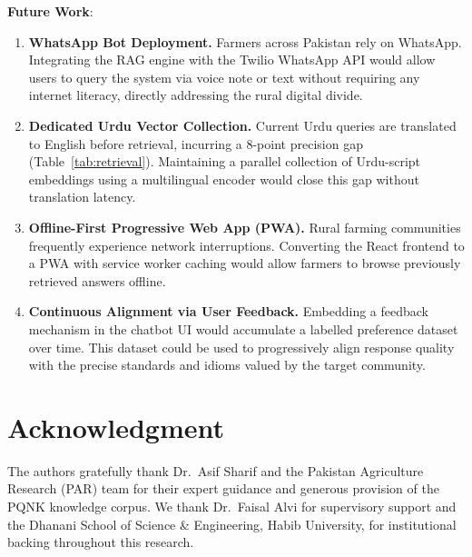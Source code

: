 \documentclass[conference]{IEEEtran}
\begin{document}
\textbf{Future Work}:
\begin{enumerate}[noitemsep, leftmargin=*]

  \item \textbf{WhatsApp Bot Deployment.}
        Farmers across Pakistan rely on WhatsApp. Integrating the RAG engine with the Twilio
        WhatsApp API would allow users to query the system via voice note or text without
        requiring any internet literacy, directly addressing the rural digital divide.

  \item \textbf{Dedicated Urdu Vector Collection.}
        Current Urdu queries are translated to English before retrieval, incurring a
        8-point precision gap (Table~\ref{tab:retrieval}). Maintaining a parallel
        collection of Urdu-script embeddings using a multilingual encoder would close
        this gap without translation latency.

  \item \textbf{Offline-First Progressive Web App (PWA).}
        Rural farming communities frequently experience network interruptions. Converting
        the React frontend to a PWA with service worker caching would allow farmers to
        browse previously retrieved answers offline.

  \item \textbf{Continuous Alignment via User Feedback.}
        Embedding a feedback mechanism in the chatbot UI would accumulate a labelled
        preference dataset over time. This dataset could be used to progressively align
        response quality with the precise standards and idioms valued by the target community.

\end{enumerate}

\section*{Acknowledgment}
The authors gratefully thank Dr.~Asif Sharif and the Pakistan Agriculture Research (PAR)
team for their expert guidance and generous provision of the PQNK knowledge corpus.
We thank Dr.~Faisal Alvi for supervisory support and the Dhanani School of Science \&
Engineering, Habib University, for institutional backing throughout this research.
\end{document}
